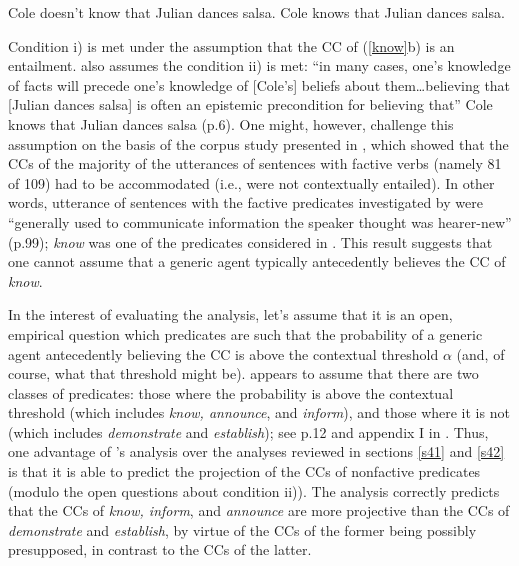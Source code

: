 \documentclass[11pt,fleqn]{article}
\newcommand{\6}{\mbox{$[\hspace*{-.6mm}[$}}
\newcommand{\9}{\mbox{$]\hspace*{-.6mm}]$}}
\newcommand{\citepos}[1]{\citeauthor{#1}'s \citeyear{#1}}
\begin{document}
\begin{exe}
\ex\label{know} 
\begin{xlist}
\ex Cole doesn't know that Julian dances salsa.
\ex Cole knows that Julian dances salsa.
\end{xlist}
\end{exe}

Condition i) is met under the assumption that the CC of (\ref{know}b) is an entailment. \citealt{schlenker2021} also assumes the condition ii) is met: ``in many cases, one's knowledge of facts will precede one's knowledge of [Cole's] beliefs about them\ldots believing that [Julian dances salsa] is often an epistemic precondition for believing that'' Cole knows that Julian dances salsa (p.6). One might, however, challenge this assumption on the basis of the corpus study presented in \citealt{spenader02}, which showed that the CCs of the majority of the utterances of sentences with factive verbs (namely 81 of 109) had to be accommodated (i.e., were not contextually entailed). In other words, utterance of sentences with the factive predicates investigated by \citet{spenader02} were ``generally used to communicate information the speaker thought was hearer-new'' (p.99); {\em know} was one of the predicates considered in \citealt{spenader02}. This result suggests that one cannot assume that a generic agent typically antecedently believes the CC of {\em know}.

In the interest of evaluating the analysis, let's assume that it is an open, empirical question which predicates are such that the probability of a generic agent antecedently believing the CC is above the contextual threshold $\alpha$ (and, of course, what that threshold might be). \citealt{schlenker2021} appears to assume that there are two classes of predicates: those where the probability is above the contextual threshold (which includes {\em know, announce}, and {\em inform}), and those where it is not (which includes {\em demonstrate} and {\em establish}); see p.12 and appendix I in \citealt{schlenker2021}. Thus, one advantage of \citepos{schlenker2021} analysis over the analyses reviewed in sections \ref{s41} and \ref{s42} is that it is able to predict the projection of the CCs of nonfactive predicates (modulo the open questions about condition ii)). The analysis correctly predicts that the CCs of \emph{know, inform}, and \emph{announce} are more projective than the CCs of \emph{demonstrate} and \emph{establish}, by virtue of the CCs of the former being possibly presupposed, in contrast to the CCs of the latter. 
\end{document}
